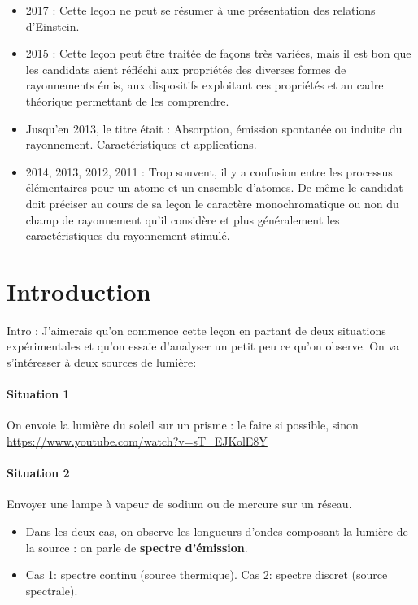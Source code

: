 \documentclass[11pt]{report}
\numberwithin{figure}{section}
\numberwithin{equation}{section}
\numberwithin{table}{section}
\newcommand{\1}{\boldsymbol{1}}
\begin{document}
\begin{itemize}
\item 2017 : Cette leçon ne peut se résumer à une présentation des relations d’Einstein.
\item 2015 : Cette leçon peut être traitée de façons très variées, mais il est bon que les candidats
aient réfléchi aux propriétés des diverses formes de rayonnements émis, aux dispositifs
exploitant ces propriétés et au cadre théorique permettant de les comprendre.
\item Jusqu’en 2013, le titre était : Absorption, émission spontanée ou induite du rayonnement.
Caractéristiques et applications.
\item 2014, 2013, 2012, 2011 : Trop souvent, il y a confusion entre les processus élémentaires
pour un atome et un ensemble d’atomes. De même le candidat doit préciser au cours de
sa leçon le caractère monochromatique ou non du champ de rayonnement qu’il considère
et plus généralement les caractéristiques du rayonnement stimulé.
\end{itemize}


\section*{Introduction}
  
Intro : J'aimerais qu'on commence cette leçon en partant de deux situations expérimentales et qu'on essaie d'analyser un petit peu ce qu'on observe. On va s'intéresser à deux sources de lumière:

\paragraph{Situation 1} On envoie la lumière du soleil sur un prisme : le faire si possible, sinon \url{https://www.youtube.com/watch?v=sT_EJKolE8Y}

\paragraph{Situation 2} Envoyer une lampe à vapeur de sodium ou de mercure sur un réseau.

\begin{itemize}
\item Dans les deux cas, on observe les longueurs d'ondes composant la lumière de la source : on parle de \textbf{spectre d'émission}.
\item Cas 1: spectre continu (source thermique). Cas 2: spectre discret (source spectrale).
\end{itemize}
\end{document}
